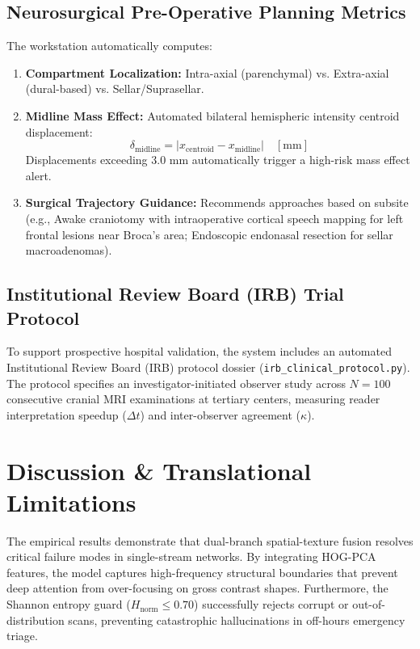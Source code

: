 \documentclass[journal,twocolumn,10pt]{IEEEtran}
\begin{document}
\subsection{Neurosurgical Pre-Operative Planning Metrics}
The workstation automatically computes:
\begin{enumerate}
    \item \textbf{Compartment Localization:} Intra-axial (parenchymal) vs. Extra-axial (dural-based) vs. Sellar/Suprasellar.
    \item \textbf{Midline Mass Effect:} Automated bilateral hemispheric intensity centroid displacement:
    \begin{equation}
        \delta_{\text{midline}} = |x_{\text{centroid}} - x_{\text{midline}}| \quad [\text{mm}]
    \end{equation}
    Displacements exceeding $3.0\text{ mm}$ automatically trigger a high-risk mass effect alert.
    \item \textbf{Surgical Trajectory Guidance:} Recommends approaches based on subsite (e.g., Awake craniotomy with intraoperative cortical speech mapping for left frontal lesions near Broca's area; Endoscopic endonasal resection for sellar macroadenomas).
\end{enumerate}

\subsection{Institutional Review Board (IRB) Trial Protocol}
To support prospective hospital validation, the system includes an automated Institutional Review Board (IRB) protocol dossier (\texttt{irb\_clinical\_protocol.py}). The protocol specifies an investigator-initiated observer study across $N = 100$ consecutive cranial MRI examinations at tertiary centers, measuring reader interpretation speedup ($\Delta t$) and inter-observer agreement ($\kappa$).

\section{Discussion \& Translational Limitations}
The empirical results demonstrate that dual-branch spatial-texture fusion resolves critical failure modes in single-stream networks. By integrating HOG-PCA features, the model captures high-frequency structural boundaries that prevent deep attention from over-focusing on gross contrast shapes. Furthermore, the Shannon entropy guard ($H_{\text{norm}} \le 0.70$) successfully rejects corrupt or out-of-distribution scans, preventing catastrophic hallucinations in off-hours emergency triage.
\end{document}

